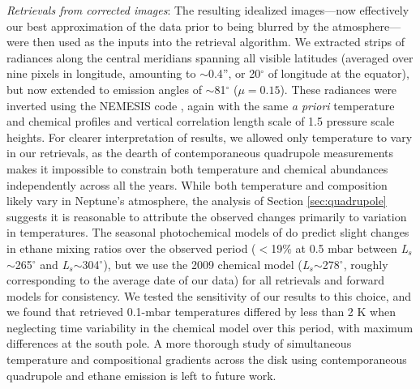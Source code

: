 \documentclass[twocolumn,10pt]{aastex631}
\begin{document}
\textit{Retrievals from corrected images}:  The resulting idealized images---now effectively our best approximation of the data prior to being blurred by the atmosphere---were then used as the inputs into the retrieval algorithm.  We extracted strips of radiances along the central meridians spanning all visible latitudes (averaged over nine pixels in longitude, amounting to $\sim$0.4'', or 20$^{\circ}$ of longitude at the equator), but now extended to emission angles of $\sim$81$^{\circ}$ ($\mu = 0.15$).  These radiances were inverted using the NEMESIS code \citep{irwin2008nemesis}, again with the same \textit{a priori} temperature and chemical profiles and vertical correlation length scale of 1.5 pressure scale heights. For clearer interpretation of results, we allowed only temperature to vary in our retrievals, as the dearth of contemporaneous quadrupole measurements makes it impossible to constrain both temperature and chemical abundances independently across all the years.  While both temperature and composition likely vary in Neptune's atmosphere, the analysis of Section \ref{sec:quadrupole} suggests it is reasonable to attribute the observed changes primarily to variation in temperatures. The seasonal photochemical models of \citet{moses2018seasonal} do predict slight changes in ethane mixing ratios over the observed period ($<$19$\%$ at 0.5 mbar between \textit{L$_s$}$\sim$265$^{\circ}$ and \textit{L$_s$}$\sim$304$^{\circ}$), but we use the 2009 chemical model (\textit{L$_s$}$\sim$278$^{\circ}$, roughly corresponding to the average date of our data) for all retrievals and forward models for consistency.  We tested the sensitivity of our results to this choice, and we found that retrieved 0.1-mbar temperatures differed by less than 2 K when neglecting time variability in the chemical model over this period, with maximum differences at the south pole. A more thorough study of simultaneous temperature and compositional gradients across the disk using contemporaneous quadrupole and ethane emission \citep[\textit{e.g.}, following][]{greathouse2011spatially} is left to future work.  
\end{document}
